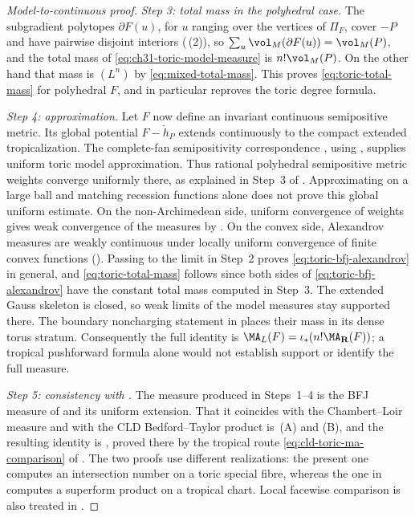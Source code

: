 \begin{proof}[Model-to-continuous proof]
\emph{Step 3: total mass in the polyhedral case.}  The subgradient
polytopes $\partial F(u)$, for $u$ ranging over the vertices of
$\Pi_F$, cover $-P$ and have pairwise disjoint interiors
(\,(2)), so
$\sum_u\vol_M(\partial F(u))=\vol_M(P)$, and the total mass of
\eqref{eq:ch31-toric-model-measure} is $n!\vol_M(P)$.  On the other hand
that mass is $(L^n)$ by \eqref{eq:mixed-total-mass}.  This proves
\eqref{eq:toric-total-mass} for polyhedral $F$, and in particular
reproves the toric degree formula.

\emph{Step 4: approximation.}  Let $F$ now define an invariant continuous
semipositive metric.  Its global potential $F-\check h_P$ extends
continuously to the compact extended tropicalization.  The complete-fan semipositivity correspondence
\cite[Section~5.3.7 and Theorem~5.3.11]{BGJKK25}, using
\cite[Theorem~4.8.1]{BGPS14}, supplies uniform toric model approximation.
Thus rational polyhedral semipositive metric weights converge uniformly
there, as explained in Step~3 of .  Approximating
on a large ball and matching recession functions alone does not prove
this global uniform estimate.  On the
non-Archimedean side,
uniform convergence of weights gives weak convergence of the measures by
.  On the convex side, Alexandrov
measures are weakly continuous under locally uniform convergence of finite
convex functions ().  Passing to the limit
in Step~2 proves \eqref{eq:toric-bfj-alexandrov} in general, and
\eqref{eq:toric-total-mass} follows since both sides of
\eqref{eq:toric-bfj-alexandrov} have the constant total mass computed in
Step~3.  The extended Gauss skeleton is closed, so weak limits of the
model measures stay supported there.  The boundary noncharging statement
in  places their mass in its dense torus stratum.
Consequently the full identity is
$\MA_L(F)=\iota_*(n!\MA_{\mathbf R}(F))$; a tropical pushforward formula
alone would not establish support or identify the full measure.

\emph{Step 5: consistency with .}  The measure produced in
Steps~1--4 is the BFJ measure of  and its
uniform extension.  That it coincides with the Chambert--Loir measure and
with the CLD Bedford--Taylor product is
\,(A) and (B), and the resulting identity
is , proved there by the tropical route
\eqref{eq:cld-toric-ma-comparison} of \cite[Theorem~6.1.1]{BGJKK25}.  The
two proofs use different realizations: the present one computes an
intersection number on a toric special fibre, whereas the one in
 computes a superform product on a tropical chart.
Local facewise comparison is also treated in \cite{Vil20}.
\end{proof}

